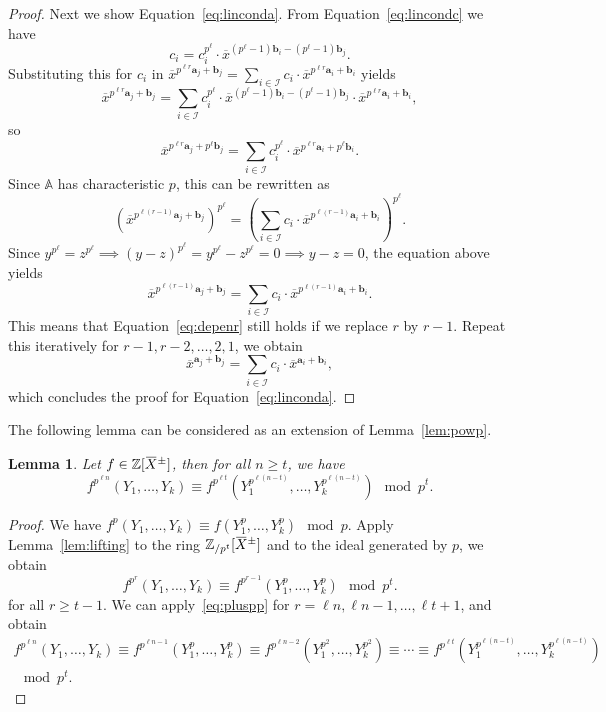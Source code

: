\documentclass[letterpaper, 11pt, thm-restate]{article}
\numberwithin{equation}{section}
\newcommand{\Z}{\mathbb{Z}}
\newcommand{\A}{\mathbb{A}}
\newcommand{\mI}{\mathcal{I}}
\newcommand{\ba}{\boldsymbol{a}}
\newcommand{\bb}{\boldsymbol{b}}
\newcommand{\oX}{\mkern 1.5mu\overline{\mkern-1.5mu X \mkern-1.5mu}\mkern 1.5mu}
\newcommand{\ox}{\overline{x}}
\newtheorem{lem}[thrm]{Lemma}
\theoremstyle{definition}
\theoremstyle{definition}
\theoremstyle{definition}
\begin{document}
\begin{proof}
    Next we show Equation~\eqref{eq:linconda}.
    From Equation~\eqref{eq:lincondc} we have
    \[
    c_i = c_i^{p^{\ell}} \cdot \ox^{(p^{\ell} - 1) \bb_i - (p^{\ell} - 1) \bb_j}.
    \]
    Substituting this for $c_i$ in $\ox^{p^{\ell r} \ba_j + \bb_j} = \sum_{i \in \mI} c_i \cdot \ox^{p^{\ell r} \ba_i + \bb_i}$ yields
    \[
    \ox^{p^{\ell r} \ba_j + \bb_j} = \sum_{i \in \mI} c_i^{p^{\ell}} \cdot \ox^{(p^{\ell} - 1) \bb_i - (p^{\ell} - 1) \bb_j} \cdot \ox^{p^{\ell r} \ba_i + \bb_i},
    \]
    so
    \[
    \ox^{p^{\ell r} \ba_j + p^{\ell}\bb_j} = \sum_{i \in \mI} c_i^{p^{\ell}} \cdot \ox^{p^{\ell r} \ba_i + p^{\ell}\bb_i}.
    \]
    Since $\A$ has characteristic $p$, this can be rewritten as
    \[
    \left(\ox^{p^{\ell (r-1)} \ba_j + \bb_j}\right)^{p^{\ell}} = \left(\sum_{i \in \mI} c_i \cdot \ox^{p^{\ell (r-1)} \ba_i + \bb_i}\right)^{p^{\ell}}.
    \]
    Since $y^{p^{\ell}} = z^{p^{\ell}} \implies (y - z)^{p^{\ell}} = y^{p^{\ell}} - z^{p^{\ell}} = 0 \implies y - z = 0$, the equation above yields
    \[
    \ox^{p^{\ell (r-1)} \ba_j + \bb_j} = \sum_{i \in \mI} c_i \cdot \ox^{p^{\ell (r-1)} \ba_i + \bb_i}.
    \]
    This means that Equation~\eqref{eq:depenr} still holds if we replace $r$ by $r-1$.
    Repeat this iteratively for $r - 1, r-2, \ldots, 2, 1$, we obtain
    \[
    \ox^{\ba_j + \bb_j} = \sum_{i \in \mI} c_i \cdot \ox^{\ba_i + \bb_i},
    \]
    which concludes the proof for Equation~\eqref{eq:linconda}.
\end{proof}

The following lemma can be considered as an extension of Lemma~\ref{lem:powp}.
\begin{lem}\label{lem:powpn}
    Let $f \in \Z[\oX^{\pm}]$, then for all $n \geq t$, we have 
    \[
    f^{p^{\ell n}}(Y_1, \ldots, Y_k) \equiv f^{p^{\ell t}}(Y_1^{p^{\ell (n-t)}}, \ldots, Y_k^{p^{\ell (n-t)}}) \mod p^t.
    \]
\end{lem}
\begin{proof}
    We have $f^p(Y_1, \ldots, Y_k) \equiv f(Y_1^p, \ldots, Y_k^p) \mod p$.
    Apply Lemma~\ref{lem:lifting} to the ring $\Z_{/p^t}[\oX^{\pm}]$ and to the ideal generated by $p$, we obtain
    \begin{equation}\label{eq:pluspp}
    f^{p^{r}}(Y_1, \ldots, Y_k) \equiv f^{p^{r - 1}}(Y_1^p, \ldots, Y_k^p) \mod p^t.
    \end{equation}
    for all $r \geq t-1$.
    We can apply~\eqref{eq:pluspp} for $r = \ell n, \ell n-1, \ldots, \ell t + 1$, and obtain
    \begin{multline*}
    f^{p^{\ell n}}(Y_1, \ldots, Y_k) \equiv f^{p^{\ell n-1}}(Y_1^p, \ldots, Y_k^p) \equiv f^{p^{\ell n-2}}(Y_1^{p^2}, \ldots, Y_k^{p^2}) \equiv \cdots \equiv f^{p^{\ell t}}(Y_1^{p^{\ell (n-t)}}, \ldots, Y_k^{p^{\ell (n-t)}}) \\
    \mod p^t.
    \end{multline*}
\end{proof}
\end{document}
